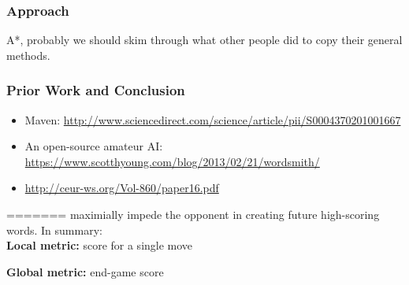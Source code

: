 \documentclass[12pt]{article}
\begin{document}

\subsubsection*{Approach}
A*, probably we should skim through what other people did to copy their general methods.

\subsubsection*{Prior Work and Conclusion}
\begin{footnotesize}
\begin{itemize}
\item Maven: \url{http://www.sciencedirect.com/science/article/pii/S0004370201001667}
\item An open-source amateur AI: \url{https://www.scotthyoung.com/blog/2013/02/21/wordsmith/}
\item \url{http://ceur-ws.org/Vol-860/paper16.pdf}
\end{itemize}
\end{footnotesize}
=======
maximially impede the opponent in creating future high-scoring
words. In summary:\\

\textbf{Local metric:} score for a single move

\textbf{Global metric:} end-game score
\end{document}
